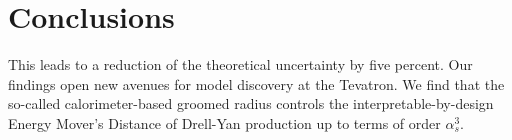 \section{Conclusions}\label{sec:conclusions}

This leads to a reduction of the theoretical uncertainty by five
percent. Our findings open new avenues for model discovery at the
Tevatron. We find that the so-called calorimeter-based groomed radius
controls the interpretable-by-design Energy Mover's Distance of
Drell-Yan production up to terms of order $\alpha_s^3$.

